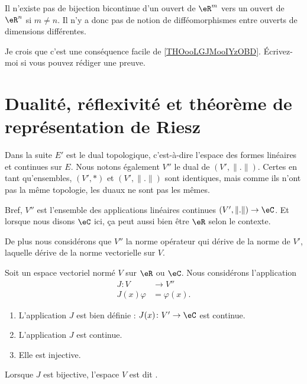 \begin{remark}  %
	Il n'existe pas de bijection bicontinue d'un ouvert de \( \eR^m\) vers un ouvert de \( \eR^n\) si \( m\neq n\). Il n'y a donc pas de notion de difféomorphismes entre ouverts de dimensions différentes.

	Je crois que c'est une conséquence facile de \ref{THOooLGJMooIYzOBD}. Écrivez-moi si vous pouvez rédiger une preuve.
\end{remark}


\section{Dualité, réflexivité et théorème de représentation de Riesz}

Dans la suite \( E'\) est le dual topologique, c'est-à-dire l'espace des formes linéaires et continues sur \( E\). Nous notons également \( V''\) le dual de \( (V',\| . \|)\). Certes en tant qu'ensembles, \( (V',*)\) et \( (V',\| . \|) \) sont identiques, mais comme ils n'ont pas la même topologie, les duaux ne sont pas les mêmes.

Bref, \( V''\) est l'ensemble des applications linéaires continues \( (V',\| . \|)\to \eC\). Et lorsque nous disons \( \eC\) ici, ça peut aussi bien être \( \eR\) selon le contexte.

De plus nous considérons que \( V''\) la norme opérateur qui dérive de la norme de \( V'\), laquelle dérive de la norme vectorielle sur \( V\).

\begin{propositionDef}      \label{PROPooMAQSooCGFBBM}
	Soit un espace vectoriel normé \( V\) sur \( \eR\) ou \( \eC\). Nous considérons l'application
	\begin{equation}		\label{EQooRQIMooZdVkDO}
		\begin{aligned}
			J\colon V   & \to V''       \\
			J(x)\varphi & = \varphi(x).
		\end{aligned}
	\end{equation}
	\begin{enumerate}
		\item       \label{ITEMooNVVSooNFXgnE}
		      L'application \( J\) est bien définie : \( J(x)\colon V'\to \eC\) est continue.
		\item       \label{ITEMooKURHooZZWpbu}
		      L'application \( J\) est continue.
		\item       \label{ITEMooTFYVooKhMOjp}
		      Elle est injective.
	\end{enumerate}

	Lorsque \( J\) est bijective, l'espace \( V\) est dit .
\end{propositionDef}

